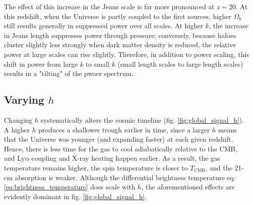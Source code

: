 \documentclass[floats,floatfix,showpacs,amssymb,prd,superscriptaddress,nofootinbib]{revtex4-2} %
\begin{document}
The effect of this increase in the Jeans scale is far more pronounced at $z = 20$. At this redshift, when the Universe is partly coupled to the first sources, higher $\Omega_b$ still results generally in suppressed power over all scales. At higher $k$, the increase in Jeans length suppresses power through pressure; conversely, because haloes cluster slightly less strongly when dark matter density is reduced, the relative power at large scales can rise slightly. Therefore, in addition to power scaling, this shift in power from large $k$ to small $k$ (small length scales to large length scales) results in a "tilting" of the pwoer spectrum.



\subsection{Varying $h$}

Changing $h$ systematically alters the cosmic timeline (fig. \ref{fig:global_signal_h}). A higher $h$ produces a shallower trough earlier in time, since a larger $h$ means that the Universe was younger (and expanding faster) at each given redshift. Hence, there is less time for the gas to cool adiabatically relative to the CMB, and Ly$\alpha$ coupling and X-ray heating happen earlier. As a result, the gas temperature remains higher, the spin temperature is closer to $T_{\text{CMB}}$, and the 21-cm absorption is weaker. Although the differential brightness temperature eq: \ref{eq:brightness_temperature} does scale with $h$, the aforementioned effects are evidently dominant in fig. \ref{fig:global_signal_h}. 




\end{document}
